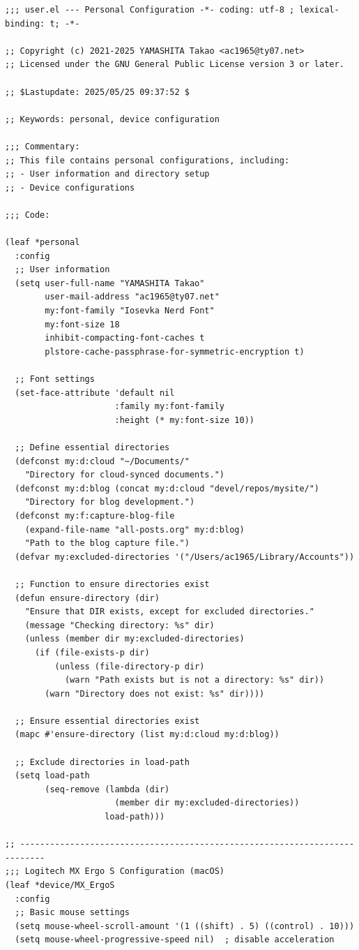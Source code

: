\documentclass[11pt]{article}
\begin{document}
\begin{verbatim}
;;; user.el --- Personal Configuration -*- coding: utf-8 ; lexical-binding: t; -*-

;; Copyright (c) 2021-2025 YAMASHITA Takao <ac1965@ty07.net>
;; Licensed under the GNU General Public License version 3 or later.

;; $Lastupdate: 2025/05/25 09:37:52 $

;; Keywords: personal, device configuration

;;; Commentary:
;; This file contains personal configurations, including:
;; - User information and directory setup
;; - Device configurations

;;; Code:

(leaf *personal
  :config
  ;; User information
  (setq user-full-name "YAMASHITA Takao"
        user-mail-address "ac1965@ty07.net"
        my:font-family "Iosevka Nerd Font"
        my:font-size 18
        inhibit-compacting-font-caches t
        plstore-cache-passphrase-for-symmetric-encryption t)

  ;; Font settings
  (set-face-attribute 'default nil
                      :family my:font-family
                      :height (* my:font-size 10))

  ;; Define essential directories
  (defconst my:d:cloud "~/Documents/"
    "Directory for cloud-synced documents.")
  (defconst my:d:blog (concat my:d:cloud "devel/repos/mysite/")
    "Directory for blog development.")
  (defconst my:f:capture-blog-file
    (expand-file-name "all-posts.org" my:d:blog)
    "Path to the blog capture file.")
  (defvar my:excluded-directories '("/Users/ac1965/Library/Accounts"))

  ;; Function to ensure directories exist
  (defun ensure-directory (dir)
    "Ensure that DIR exists, except for excluded directories."
    (message "Checking directory: %s" dir)
    (unless (member dir my:excluded-directories)
      (if (file-exists-p dir)
          (unless (file-directory-p dir)
            (warn "Path exists but is not a directory: %s" dir))
        (warn "Directory does not exist: %s" dir))))

  ;; Ensure essential directories exist
  (mapc #'ensure-directory (list my:d:cloud my:d:blog))

  ;; Exclude directories in load-path
  (setq load-path
        (seq-remove (lambda (dir)
                      (member dir my:excluded-directories))
                    load-path)))

;; ---------------------------------------------------------------------------
;;; Logitech MX Ergo S Configuration (macOS)
(leaf *device/MX_ErgoS
  :config
  ;; Basic mouse settings
  (setq mouse-wheel-scroll-amount '(1 ((shift) . 5) ((control) . 10)))
  (setq mouse-wheel-progressive-speed nil)  ; disable acceleration


\end{verbatim}
\end{document}
